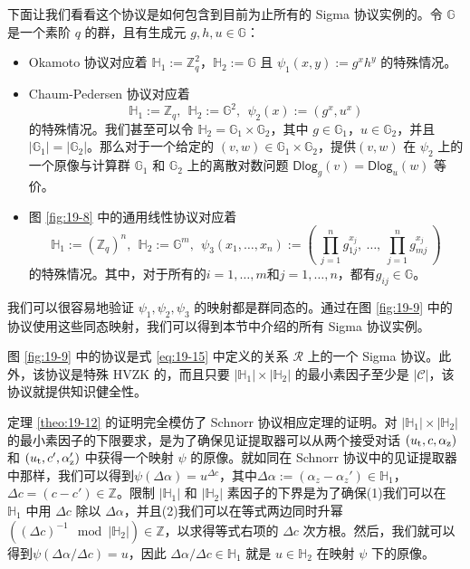 下面让我们看看这个协议是如何包含到目前为止所有的 Sigma 协议实例的。令 $\mathbb{G}$ 是一个素阶 $q$ 的群，且有生成元 $g,h,u\in\mathbb{G}$：
\begin{itemize}
	\item Okamoto 协议对应着 $\mathbb{H}_1:=\mathbb{Z}_q^2$，$\mathbb{H}_2:=\mathbb{G}$ 且 $\psi_1(x,y):=g^xh^y$ 的特殊情况。
	\item Chaum-Pedersen 协议对应着
	$$\mathbb{H}_1:=\mathbb{Z}_q,~~\mathbb{H}_2:=\mathbb{G}^2, ~~\psi_2(x):=(g^x,u^x)$$
	的特殊情况。我们甚至可以令 $\mathbb{H}_2=\mathbb{G}_1\times\mathbb{G}_2$，其中 $g\in\mathbb{G}_1$，$u\in\mathbb{G}_2$，并且 $|\mathbb{G}_1|=|\mathbb{G}_2|$。那么对于一个给定的 $(v,w)\in\mathbb{G}_1\times\mathbb{G}_2$，提供$(v, w)$ 在 $\psi_2$ 上的一个原像与计算群 $\mathbb{G}_1$ 和 $\mathbb{G}_2$ 上的离散对数问题 $\mathsf{Dlog}_g(v)=\mathsf{Dlog}_u(w)$ 等价。
	\item 图 \ref{fig:19-8} 中的通用线性协议对应着
	$$
    \mathbb{H}_1:=(\mathbb{Z}_q)^n,~~
    \mathbb{H}_2:=\mathbb{G}^m,~~
    \psi_3(x_1,\dots,x_n):=
    \left(
    ~\prod_{j=1}^ng_{1j}^{x_j},~\dots,~\prod_{j=1}^ng_{mj}^{x_j}~
    \right)
    $$
    的特殊情况。其中，对于所有的$i=1,\dots,m$和$j=1,\dots,n$，都有$g_{ij}\in\mathbb{G}$。
\end{itemize}
我们可以很容易地验证 $\psi_1,\psi_2,\psi_3$ 的映射都是群同态的。通过在图 \ref{fig:19-9} 中的协议使用这些同态映射，我们可以得到本节中介绍的所有 Sigma 协议实例。

\begin{theorem}\label{theo:19-12}
图 \ref{fig:19-9} 中的协议是式 \ref{eq:19-15} 中定义的关系 $\mathcal R$ 上的一个 Sigma 协议。此外，该协议是特殊 HVZK 的，而且只要 $|\mathbb{H}_1|\times|\mathbb{H}_2|$ 的最小素因子至少是 $|\mathcal{C}|$，该协议就提供知识健全性。
\end{theorem}

定理 \ref{theo:19-12} 的证明完全模仿了 Schnorr 协议相应定理的证明。对 $|\mathbb{H}_1|\times|\mathbb{H}_2|$ 的最小素因子的下限要求，是为了确保见证提取器可以从两个接受对话 $(u_{\rm t},c,\alpha_{\rm z})$ 和 $(u_{\rm t},c',\alpha_{\rm z}')$ 中获得一个映射 $\psi$ 的原像。就如同在 Schnorr 协议中的见证提取器中那样，我们可以得到$\psi(\Delta\alpha)=u^{\Delta c}$，其中$\Delta\alpha:=(\alpha_z-\alpha_z')\in\mathbb{H}_1$，$\Delta c=(c-c')\in\mathbb{Z}$。限制 $|\mathbb{H}_1|$ 和 $|\mathbb{H}_2|$ 素因子的下界是为了确保(1)我们可以在 $\mathbb{H}_1$ 中用 $\Delta c$ 除以 $\Delta\alpha$，并且(2)我们可以在等式两边同时升幂 $((\Delta c)^{-1}\mod |\mathbb{H}_2|)\in\mathbb{Z}$，以求得等式右项的 $\Delta c$ 次方根。然后，我们就可以得到$\psi({\Delta\alpha}/{\Delta c})=u$，因此 ${\Delta\alpha}/{\Delta c}\in\mathbb{H}_1$ 就是 $u\in\mathbb{H}_2$ 在映射 $\psi$ 下的原像。

